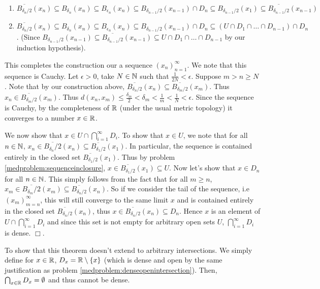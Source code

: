\documentclass{article}
\begin{document}
{    \begin{enumerate}
        \item $\overline{B_{\delta_{n}/2}}(x_{n})\subseteq B_{\delta_{n}}(x_{n})\subseteq B_{\epsilon_{n}}(x_{n})\subseteq B_{\delta_{n-1}/2}(x_{n-1})\cap D_{n}\subseteq B_{\delta_{n-1}/2}(x_{1})\subseteq \overline{B_{\delta_{n-1}/2}}(x_{n-1})$
        \item $\overline{B_{\delta_{n}/2}}(x_{n})\subseteq B_{\delta_{n}}(x_{n})\subseteq B_{\epsilon_{n}}(x_{n})\subseteq B_{\delta_{n-1}/2}(x_{n-1})\cap D_{n}\subseteq (U\cap D_{1}\cap\dots\cap D_{n-1})\cap D_{n}$. (Since $B_{\delta_{n-1}/2}(x_{n-1})\subseteq \overline{B_{\delta_{n-1}/2}}(x_{n-1})\subseteq U\cap D_{1}\cap\dots\cap D_{n-1}$ by our induction hypothesis). 
    \end{enumerate}
    This completes the construction our a sequence $(x_{n})_{n = 1}^{\infty}$. We note that this sequence is Cauchy. Let $\epsilon > 0$, take $N\in \mathbb{N}$ such that $\frac{1}{2N} < \epsilon$. Suppose $m > n \geq N$. Note that by our construction above, $\overline{B_{\delta_{n}/2}}(x_{n})\subseteq \overline{B_{\delta_{m}/2}}(x_{m})$. Thus $x_{n} \in \overline{B_{\delta_{m}/2}}(x_{m})$. Thus $d(x_{n}, x_{m}) \leq \frac{\delta_{m}}{2} < \delta_{m} < \frac{1}{m} < \frac{1}{N} < \epsilon$. Since the sequence is Cauchy, by the completeness of $\mathbb{R}$ (under the usual metric topology) it converges to a number $x\in \mathbb{R}$. 

    We now show that $x\in U\cap \bigcap_{i = 1}^{\infty}D_{i}$. To show that $x\in U$, we note that for all $n\in \mathbb{N}$, $x_{n}\in \overline{B_{\delta_{n}}/2}(x_{n})\subseteq \overline{B_{\delta_{1}/2}}(x_{1})$. In particular, the sequence is contained entirely in the closed set $\overline{B_{\delta_{1}/2}}(x_{1})$. Thus by problem \ref{medproblem:sequenceinclosure}, $x\in \overline{B_{\delta_{1}/2}}(x_{1})\subseteq U$. Now let's show that $x\in D_{n}$ for all $n\in \mathbb{N}$. This simply follows from the fact that for all $m\geq n$, $x_{m}\in \overline{B_{\delta_{m}}/2}(x_{m})\subseteq \overline{B_{\delta_{n}/2}}(x_{n})$. So if we consider the tail of the sequence, i.e $(x_{m})_{m = n}^{\infty}$, this will still converge to the same limit $x$ and is contained entirely in the closed set $\overline{B_{\delta_{n}/2}}(x_{n})$, thus $x\in \overline{B_{\delta_{n}/2}}(x_{n})\subseteq D_{n}$. Hence $x$ is an element of $U\cap \bigcap_{i = 1}^{\infty}D_{i}$ and since this set is not empty for arbitrary open sets $U$, $\bigcap_{i = 1}^{\infty}D_{i}$ is dense. $\Box$.

    To show that this theorem doesn't extend to arbitrary intersections. We simply define for $x\in \mathbb{R}$, $D_{x} = \mathbb{R}\setminus\{x\}$ (which is dense and open by the same justification as problem \ref{medproblem:denseopenintersection}). Then, $\bigcap_{x\in \mathbb{R}} D_{x} = \emptyset$ and thus cannot be dense.
}
\end{document}
